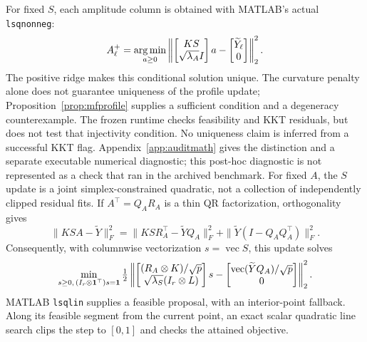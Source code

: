 For fixed $S$, each amplitude column is obtained with MATLAB's actual \texttt{lsqnonneg}:
\begin{equation}\label{eq:mfA}
 A_\ell^+=\operatorname*{arg\,min}_{a\geq0}
 \left\|\begin{bmatrix}KS\\\sqrt{\lambda_A}I\end{bmatrix}a
       -\begin{bmatrix}\widetilde Y_\ell\\0\end{bmatrix}\right\|_2^2.
\end{equation}
The positive ridge makes this conditional solution unique. The curvature penalty alone does not guarantee uniqueness of the profile update; Proposition~\ref{prop:mfprofile} supplies a sufficient condition and a degeneracy counterexample. The frozen runtime checks feasibility and KKT residuals, but does not test that injectivity condition. No uniqueness claim is inferred from a successful KKT flag. Appendix~\ref{app:auditmath} gives the distinction and a separate executable numerical diagnostic; this post-hoc diagnostic is not represented as a check that ran in the archived benchmark. For fixed $A$, the $S$ update is a joint simplex-constrained quadratic, not a collection of independently clipped residual fits. If $A^\top=Q_AR_A$ is a thin QR factorization, orthogonality gives
\begin{equation}\label{eq:mfqr}
 \|KSA-\widetilde Y\|_F^2
 =\|KS R_A^\top-\widetilde YQ_A\|_F^2+
   \|\widetilde Y(I-Q_AQ_A^\top)\|_F^2.
\end{equation}
Consequently, with columnwise vectorization $s=\operatorname{vec}S$, this update solves
\begin{equation}\label{eq:mfS}
 \min_{s\geq0,\,(I_r\otimes\mathbf{1}^\top)s=\mathbf{1}}
 \tfrac12\left\|
 \begin{bmatrix}(R_A\otimes K)/\sqrt p\\\sqrt{\lambda_S}(I_r\otimes L)\end{bmatrix}s
 -\begin{bmatrix}\operatorname{vec}(\widetilde YQ_A)/\sqrt p\\0\end{bmatrix}
 \right\|_2^2.
\end{equation}
MATLAB \texttt{lsqlin} supplies a feasible proposal, with an interior-point fallback. Along its feasible segment from the current point, an exact scalar quadratic line search clips the step to $[0,1]$ and checks the attained objective.


